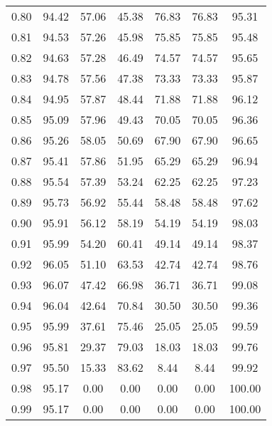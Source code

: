 \begin{tabular}{|c|c|c|c|c|c|c|}
      0.80 &     94.42 &     57.06 &      45.38 &   76.83 &      76.83 &         95.31 \\
      0.81 &     94.53 &     57.26 &      45.98 &   75.85 &      75.85 &         95.48 \\
      0.82 &     94.63 &     57.28 &      46.49 &   74.57 &      74.57 &         95.65 \\
      0.83 &     94.78 &     57.56 &      47.38 &   73.33 &      73.33 &         95.87 \\
      0.84 &     94.95 &     57.87 &      48.44 &   71.88 &      71.88 &         96.12 \\
      0.85 &     95.09 &     57.96 &      49.43 &   70.05 &      70.05 &         96.36 \\
      0.86 &     95.26 &     58.05 &      50.69 &   67.90 &      67.90 &         96.65 \\
      0.87 &     95.41 &     57.86 &      51.95 &   65.29 &      65.29 &         96.94 \\
      0.88 &     95.54 &     57.39 &      53.24 &   62.25 &      62.25 &         97.23 \\
      0.89 &     95.73 &     56.92 &      55.44 &   58.48 &      58.48 &         97.62 \\
      0.90 &     95.91 &     56.12 &      58.19 &   54.19 &      54.19 &         98.03 \\
      0.91 &     95.99 &     54.20 &      60.41 &   49.14 &      49.14 &         98.37 \\
      0.92 &     96.05 &     51.10 &      63.53 &   42.74 &      42.74 &         98.76 \\
      0.93 &     96.07 &     47.42 &      66.98 &   36.71 &      36.71 &         99.08 \\
      0.94 &     96.04 &     42.64 &      70.84 &   30.50 &      30.50 &         99.36 \\
      0.95 &     95.99 &     37.61 &      75.46 &   25.05 &      25.05 &         99.59 \\
      0.96 &     95.81 &     29.37 &      79.03 &   18.03 &      18.03 &         99.76 \\
      0.97 &     95.50 &     15.33 &      83.62 &    8.44 &       8.44 &         99.92 \\
      0.98 &     95.17 &      0.00 &       0.00 &    0.00 &       0.00 &        100.00 \\
      0.99 &     95.17 &      0.00 &       0.00 &    0.00 &       0.00 &        100.00 \\
\bottomrule
\end{tabular}
